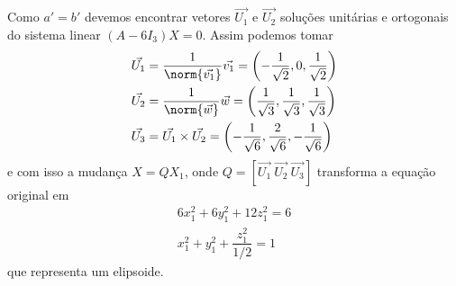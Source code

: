 \begin{exemplos}
\begin{enumerate}
\begin{solucao}
                  Como $a' = b'$ devemos encontrar vetores $\vec{U_1}$ e $\vec{U_2}$ soluções unitárias e ortogonais do sistema linear $(A - 6I_3)X = 0$. Assim podemos tomar
                  \begin{align*}
                      \vec{U_1} & = \dfrac{1}{\norm{\vec{v_1}}}\vec{v_1} = \left(-\dfrac{1}{\sqrt{2}},0,\dfrac{1}{\sqrt{2}}\right)              \\
                      \vec{U_2} & = \dfrac{1}{\norm{\vec{w}}}\vec{w} = \left(\dfrac{1}{\sqrt{3}},\dfrac{1}{\sqrt{3}},\dfrac{1}{\sqrt{3}}\right) \\
                      \vec{U_3} & = \vec{U_1}\times\vec{U_2} = \left(-\dfrac{1}{\sqrt{6}},\dfrac{2}{\sqrt{6}},-\dfrac{1}{\sqrt{6}}\right)
                  \end{align*}
                  e com isso a mudança $X = QX_1$, onde $Q = [\vec{U_1}\ \vec{U_2}\ \vec{U_3}]$ transforma a equação original em
                  \begin{align*}
                      6x_1^2 + 6y_1^2 + 12z_1^2 = 6 \\
                      x_1^2 + y_1^2 + \dfrac{z_1^2}{1/2} = 1
                  \end{align*}
                  que representa um elipsoide.
              \end{solucao}
    \end{enumerate}
\end{exemplos}
